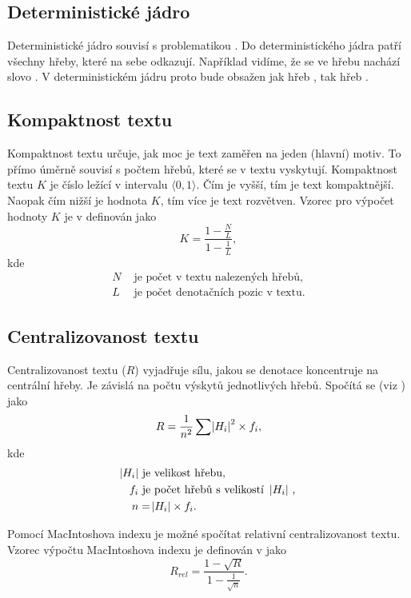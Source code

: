 \documentclass[dp.tex]{subfiles}
\begin{document}
\subsection{Deterministické jádro}
Deterministické jádro souvisí s problematikou  . Do deterministického jádra patří všechny hřeby, které na sebe odkazují. Například vidíme, že se ve hřebu  nachází slovo . V deterministickém jádru proto bude obsažen jak hřeb , tak hřeb .


\subsection{Kompaktnost textu}
Kompaktnost textu určuje, jak moc je text zaměřen na jeden (hlavní) motiv. To přímo úměrně souvisí s počtem hřebů, které se v textu vyskytují. Kompaktnost textu $K$ je číslo ležící v intervalu $\langle0, 1\rangle$. Čím je vyšší, tím je text kompaktnější. Naopak čím nižší je hodnota $K$, tím více je text rozvětven. Vzorec pro výpočet hodnoty $K$ je v \cite[str. 303]{Wimmer2003} definován jako
\begin{equation}
K=\frac{1-\frac{N}{L}}{1-\frac{1}{L}},
\end{equation}
kde 
\begin{align*}
      N & \text{ je počet v textu nalezených hřebů,}\\
      L & \text{ je počet denotačních pozic v textu.}
\end{align*}     

\subsection{Centralizovanost textu}
Centralizovanost textu ($R$) vyjadřuje sílu, jakou se denotace koncentruje na centrální hřeby. Je závislá na počtu výskytů jednotlivých hřebů. Spočítá se (viz \cite[str. 303]{Wimmer2003}) jako
\begin{equation}
R=\frac{1}{n^2}\sum{ \abs{H_i}^2 \times f_i},
\end{equation}
kde 
\begin{align*}
      \abs{H_i} & \text{ je velikost hřebu,}\\
      f_i & \text{ je počet hřebů s velikostí \abs{H_i},}\\
      n&=\abs{H_i}\times f_i.
\end{align*}     

Pomocí MacIntoshova indexu je možné spočítat relativní centralizovanost textu. Vzorec výpočtu MacIntoshova indexu je definován v \cite[str. 304]{Wimmer2003} jako
\begin{equation}
R_{rel}=\frac{1-\sqrt{R}}{1-\frac{1}{\sqrt{n}}}.
\end{equation}
\end{document}
